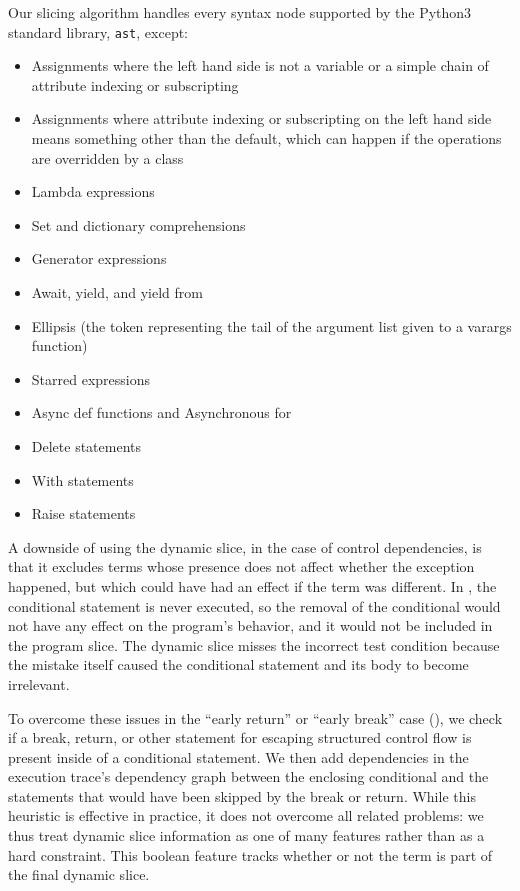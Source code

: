 \documentclass[conference]{IEEEtran}
\newcommand\lt[1]{{\lstinline|#1|}}
\begin{document}
Our slicing algorithm handles every syntax node supported by the Python3 standard
library, \lt{ast}, except:
\begin{itemize}
\item Assignments where the left hand side is not a variable or a simple chain
  of attribute indexing or subscripting
\item Assignments where attribute indexing or subscripting on the left hand side
  means something other than the default, which can happen if the operations are
  overridden by a class
\item Lambda expressions
\item Set and dictionary comprehensions
\item Generator expressions
\item Await, yield, and yield from
\item Ellipsis (the token representing the tail of the argument list given to a
  varargs function)
\item Starred expressions
\item Async def functions and Asynchronous for
\item Delete statements
\item With statements
\item Raise statements
\end{itemize}

A downside of using the dynamic slice, in the case of control dependencies, is
that it excludes terms whose presence does not affect whether the exception
happened, but which could have had an effect if the term was different. In
, the conditional statement is never
executed, so the removal of the conditional would not have any effect on
the program's behavior, and it would not be included in the program slice.
The dynamic slice misses the incorrect test condition because the mistake
itself caused the conditional statement and its body to become irrelevant.

To overcome these issues in the ``early return'' or ``early break'' case
(), we check if a break, return, or other statement for
escaping structured control flow is present inside of a conditional
statement. We then add dependencies in the execution trace's dependency graph
between the enclosing conditional and the statements that would have been skipped
by the break or return. While this heuristic is effective in practice, it
does not overcome all related problems: we thus treat dynamic slice
information as one of many features rather than as a hard constraint.
This boolean feature tracks whether or not the term is part of the final
dynamic slice.
\end{document}
